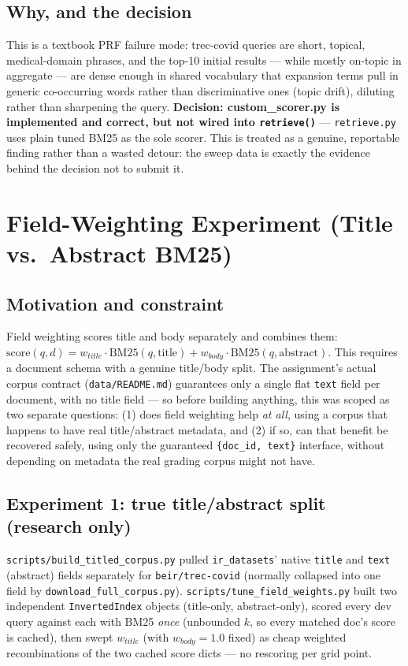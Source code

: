 \documentclass[11pt]{article}
\begin{document}
\subsection{Why, and the decision}
This is a textbook PRF failure mode: trec-covid queries are short,
topical, medical-domain phrases, and the top-10 initial results --- while
mostly on-topic in aggregate --- are dense enough in shared vocabulary
that expansion terms pull in generic co-occurring words rather than
discriminative ones (topic drift), diluting rather than sharpening the
query. \textbf{Decision: custom\_scorer.py is implemented and correct,
but not wired into \texttt{retrieve()}} --- \texttt{retrieve.py} uses
plain tuned BM25 as the sole scorer. This is treated as a genuine,
reportable finding rather than a wasted detour: the sweep data is exactly
the evidence behind the decision not to submit it.

\section{Field-Weighting Experiment (Title vs.\ Abstract BM25)}

\subsection{Motivation and constraint}
Field weighting scores title and body separately and combines them:
$\text{score}(q,d) = w_{title}\cdot\text{BM25}(q,\text{title}) +
w_{body}\cdot\text{BM25}(q,\text{abstract})$. This requires a document
schema with a genuine title/body split. The assignment's actual corpus
contract (\texttt{data/README.md}) guarantees only a single flat
\texttt{text} field per document, with no title field --- so before
building anything, this was scoped as two separate questions: (1) does
field weighting help \emph{at all}, using a corpus that happens to have
real title/abstract metadata, and (2) if so, can that benefit be
recovered safely, using only the guaranteed \texttt{\{doc\_id, text\}}
interface, without depending on metadata the real grading corpus might
not have.

\subsection{Experiment 1: true title/abstract split (research only)}
\texttt{scripts/build\_titled\_corpus.py} pulled \texttt{ir\_datasets}'
native \texttt{title} and \texttt{text} (abstract) fields separately for
\texttt{beir/trec-covid} (normally collapsed into one field by
\texttt{download\_full\_corpus.py}). \texttt{scripts/tune\_field\_weights.py}
built two independent \texttt{InvertedIndex} objects (title-only,
abstract-only), scored every dev query against each with BM25
\emph{once} (unbounded $k$, so every matched doc's score is cached), then
swept $w_{title}$ (with $w_{body}{=}1.0$ fixed) as cheap weighted
recombinations of the two cached score dicts --- no rescoring per grid
point.
\end{document}

